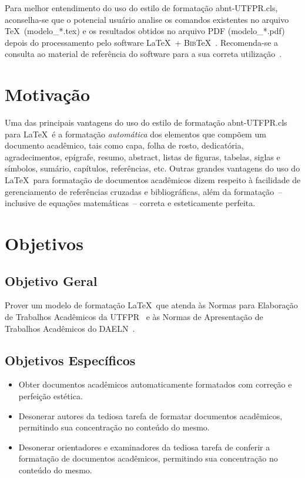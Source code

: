 \documentclass{abnt-UTFPR} %
\begin{document}
Para melhor entendimento do uso do estilo de formata\c{c}\~ao {\ttfamily abnt-UTFPR.cls}, aconselha-se que o potencial usu\'ario analise os comandos existentes no arquivo \TeX\ ({\ttfamily modelo\_*.tex}) e os resultados obtidos no arquivo PDF ({\ttfamily modelo\_*.pdf}) depois do processamento pelo software \LaTeX\ + \textsc{Bib}\TeX~\cite{LaTeX2009,BibTeX2009}. Recomenda-se a consulta ao material de refer\^encia do software para a sua correta utiliza\c{c}\~ao~\cite{Lamport1986,Buerger1989,Kopka2003,Mittelbach2004}.

\section{Motiva\c{c}\~ao}

Uma das principais vantagens do uso do estilo de formata\c{c}\~ao {\ttfamily abnt-UTFPR.cls} para \LaTeX\ \'e a formata\c{c}\~ao \textit{autom\'atica} dos elementos que comp\~oem um documento acad\^emico, tais como capa, folha de rosto, dedicat\'oria, agradecimentos, ep\'igrafe, resumo, abstract, listas de figuras, tabelas, siglas e s\'imbolos, sum\'ario, cap\'itulos, refer\^encias, etc. Outras grandes vantagens do uso do \LaTeX\ para formata\c{c}\~ao de documentos acad\^emicos dizem respeito \`a facilidade de gerenciamento de refer\^encias cruzadas e bibliogr\'aficas, al\'em da formata\c{c}\~ao~-- inclusive de equa\c{c}\~oes  matem\'aticas~-- correta e esteticamente perfeita.

\section{Objetivos}

\subsection{Objetivo Geral}

Prover um modelo de formata\c{c}\~ao \LaTeX\ que atenda \`as Normas para Elabora\c{c}\~ao de Trabalhos Acad\^emicos da UTFPR~\cite{UTFPR2008} e \`as Normas de Apresenta\c{c}\~ao de Trabalhos Acad\^emicos do DAELN~\cite{DAELN2006}.

\subsection{Objetivos Espec\'ificos}

\begin{itemize}
	\item Obter documentos acad\^emicos automaticamente formatados com corre\c{c}\~ao e perfei\c{c}\~ao est\'etica.
	\item Desonerar autores da tediosa tarefa de formatar documentos acad\^emicos, permitindo sua concentra\c{c}\~ao no conte\'udo do mesmo.
	\item Desonerar orientadores e examinadores da tediosa tarefa de conferir a formata\c{c}\~ao de documentos acad\^emicos, permitindo sua concentra\c{c}\~ao no conte\'udo do mesmo.
\end{itemize}
\end{document}
